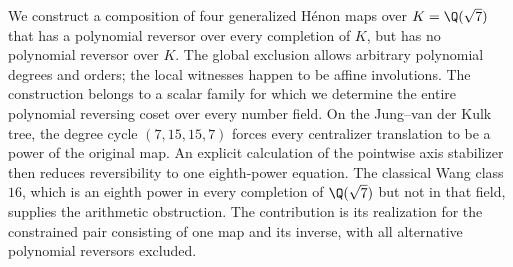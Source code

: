 We construct a composition of four generalized H\'enon maps over
$K=\Q(\sqrt7)$ that has a polynomial reversor over every completion of
$K$, but has no polynomial reversor over $K$. The global exclusion
allows arbitrary polynomial degrees and orders; the local witnesses
happen to be affine involutions. The construction belongs to a scalar
family for which we determine the entire polynomial reversing coset
over every number field. On the Jung--van der Kulk tree, the degree
cycle $(7,15,15,7)$ forces every centralizer translation to be a power
of the original map. An explicit calculation of the pointwise axis
stabilizer then reduces reversibility to one eighth-power equation.
The classical Wang class $16$, which is an eighth power in every
completion of $\Q(\sqrt7)$ but not in that field, supplies the arithmetic
obstruction. The contribution is its realization for the constrained
pair consisting of one map and its inverse, with all alternative
polynomial reversors excluded.
